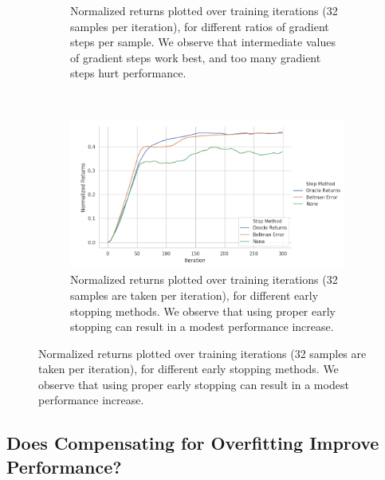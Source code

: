 \begin{figure}[ttt!]
\begin{subfigure}{0.31\linewidth}
\caption{\label{fig:fqi_grad_sweep}Normalized returns plotted over training iterations (32 samples per iteration), for different ratios of gradient steps per sample. We observe that intermediate values of gradient steps work best, and too many gradient steps hurt performance.}
\end{subfigure}
~\vline~
\begin{subfigure}{0.31\linewidth}
\includegraphics[trim={0 0 4.4cm 0},clip,width=0.97\linewidth]{chapters/diagnosing_q/images/validation_stop}
\caption{\label{fig:validation_stop}Normalized returns plotted over training iterations (32 samples are taken per iteration), for different early stopping methods. We observe that using proper early stopping can result in a modest performance increase.}
\end{subfigure}
\end{figure}

\vspace{-0.2cm}
\subsection{Does Compensating for Overfitting Improve Performance?}
\vspace{-0.2cm}

